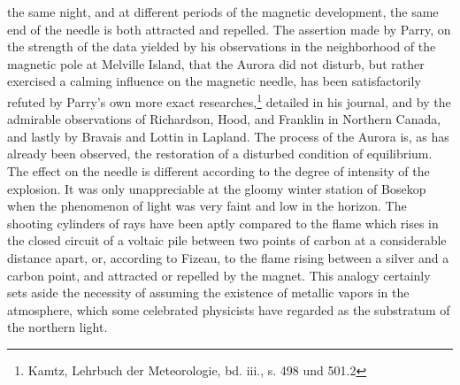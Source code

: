 the same night, and at different periods of the magnetic development, the same end of the needle is both attracted and repelled. The assertion made by Parry, on the strength of the data yielded by his observations in the neighborhood of the magnetic pole at Melville Island, that the Aurora did not disturb, but rather exercised a calming influence on the magnetic needle, has been satisfactorily refuted by Parry's own more exact researches,\footnote{Kamtz, Lehrbuch der Meteorologie, bd. iii., s. 498 und 501.2} detailed in his journal, and by the admirable observations of Richardson, Hood, and Franklin in Northern Canada, and lastly by Bravais and Lottin in Lapland. The process of the Aurora is, as has already been observed, the restoration of a disturbed condition of equilibrium. The effect on the needle is different according to the degree of intensity of the explosion. It was only unappreciable at the gloomy winter station of Bosekop when the phenomenon of light was very faint and low in the horizon. The shooting cylinders of rays have been aptly compared to the flame which rises in the closed circuit of a voltaic pile between two points of carbon at a considerable distance apart, or, according to Fizeau, to the flame rising between a silver and a carbon point, and attracted or repelled by the magnet. This analogy certainly sets aside the necessity of assuming the existence of metallic vapors in the atmosphere, which some celebrated physicists have regarded as the substratum of the northern light.

